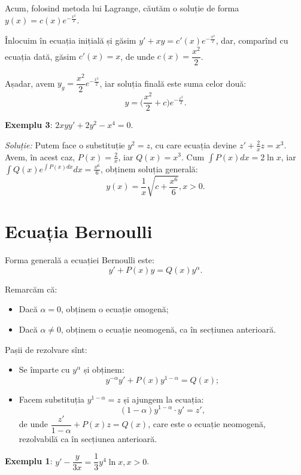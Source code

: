 Acum, folosind metoda lui Lagrange, căutăm o soluție de forma $y(x) = c(x) e^{-\frac{x^2}{2}}$.

Înlocuim în ecuația inițială și găsim $y' + xy = c'(x) e^{-\frac{x^2}{2}}$, dar, comparînd
cu ecuația dată, găsim $c'(x) = x$, de unde $c(x) = \dfrac{x^2}{2}$.

Așadar, avem $y_g = \dfrac{x^2}{2} e^{-\frac{x^2}{2}}$, iar soluția finală este suma celor două:
\[
  y = \Big( \frac{x^2}{2} + c \Big) e^{-\frac{x^2}{2}}.
\]

\vspace{1cm}

\textbf{Exemplu 3}: $2xyy' + 2y^2 - x^4 = 0$.

\emph{Soluție:} Putem face o substituție $y^2 = z$, cu care
ecuația devine $z' + \frac{2}{x} z = x^3$. Avem, în acest caz, $P(x) = \frac{2}{x}$,
iar $Q(x) = x^3$. Cum $\int P(x) dx = 2 \ln x$, iar $\int Q(x) e^{\int P(x) dx} dx = \frac{x^6}{6}$,
obținem soluția generală:
\[
  y(x) = \frac{1}{x} \sqrt{c + \frac{x^6}{6}}, x > 0.
\]


\section{Ecuația Bernoulli}
\label{sec:bernoulli}

Forma generală a ecuației Bernoulli este:
\[
  y' + P(x) y = Q(x) y^\alpha.
\]

Remarcăm că:
\begin{itemize}
\item Dacă $\alpha = 0$, obținem o ecuație omogenă;
\item Dacă $\alpha \neq 0$, obținem o ecuație neomogenă, ca în secțiunea anterioară.
\end{itemize}

Pașii de rezolvare sînt:
\begin{itemize}
\item Se împarte cu $y^\alpha$ și obținem:
  \[
    y^{-\alpha} y' + P(x) y^{1 - \alpha} = Q(x);
  \]
\item Facem substituția $y^{1 - \alpha} = z$ și ajungem la ecuația:
  \[
    (1 - \alpha) y^{1 - \alpha} \cdot y' = z',
\]
de unde $\dfrac{z'}{1 - \alpha} + P(x) z = Q(x)$, care este o ecuație
neomogenă, rezolvabilă ca în secțiunea anterioară.
\end{itemize}

\textbf{Exemplu 1}: $y' - \dfrac{y}{3x} = \dfrac{1}{3} y^4 \ln x, x > 0$.

